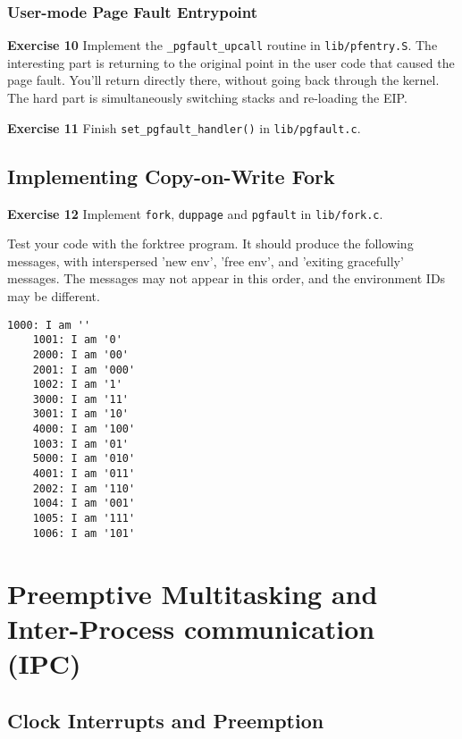 \documentclass[11pt]{article}
\begin{document}
\subsubsection{User-mode Page Fault Entrypoint}
\begin{framed}
\noindent\textbf{Exercise 10} Implement the \lstinline|_pgfault_upcall| routine in \lstinline|lib/pfentry.S|. The interesting part is returning to the original point in the user code that caused the page fault. You'll return directly there, without going back through the kernel. The hard part is simultaneously switching stacks and re-loading the EIP.
\end{framed}
\begin{framed}
\noindent\textbf{Exercise 11} Finish \lstinline|set_pgfault_handler()| in \lstinline|lib/pgfault.c|.
\end{framed}
\subsection{Implementing Copy-on-Write Fork}
\begin{framed}
\noindent\textbf{Exercise 12} Implement \lstinline|fork|, \lstinline|duppage| and \lstinline|pgfault| in \lstinline|lib/fork.c|.

Test your code with the forktree program. It should produce the following messages, with interspersed 'new env', 'free env', and 'exiting gracefully' messages. The messages may not appear in this order, and the environment IDs may be different.

\begin{lstlisting}[aboveskip=-1.5em,frame=none]
	1000: I am ''
	1001: I am '0'
	2000: I am '00'
	2001: I am '000'
	1002: I am '1'
	3000: I am '11'
	3001: I am '10'
	4000: I am '100'
	1003: I am '01'
	5000: I am '010'
	4001: I am '011'
	2002: I am '110'
	1004: I am '001'
	1005: I am '111'
	1006: I am '101'
\end{lstlisting}
\end{framed}
\section{Preemptive Multitasking and Inter-Process communication (IPC)}
\subsection{Clock Interrupts and Preemption}
\end{document}
